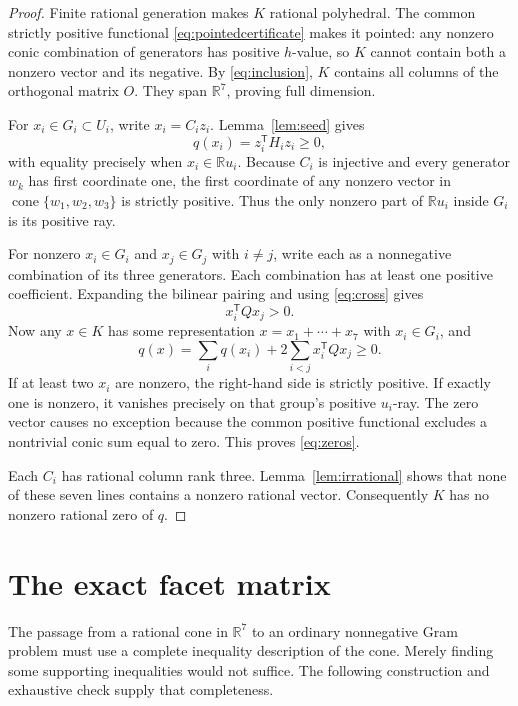 \documentclass[11pt]{article}
\theoremstyle{definition}
\newcommand{\R}{\mathbb R}
\newcommand{\cone}{\operatorname{cone}}
\newcommand{\trans}{^{\mathsf T}}
\numberwithin{equation}{section}
\begin{document}
\begin{proof}
Finite rational generation makes $K$ rational polyhedral. The common
strictly positive functional \eqref{eq:pointedcertificate} makes it pointed:
any nonzero conic combination of generators has positive $h$-value, so
$K$ cannot contain both a nonzero vector and its negative. By
\eqref{eq:inclusion}, $K$ contains all columns of the orthogonal matrix $O$.
They span $\R^7$, proving full dimension.

For $x_i\in G_i\subset U_i$, write $x_i=C_iz_i$. Lemma~\ref{lem:seed} gives
\[
 q(x_i)=z_i\trans H_iz_i\geq0,
\]
with equality precisely when $x_i\in\R u_i$. Because $C_i$ is injective
and every generator $w_k$ has first coordinate one, the first coordinate
of any nonzero vector in $\cone\{w_1,w_2,w_3\}$ is strictly positive.
Thus the only nonzero part of $\R u_i$ inside $G_i$ is its positive ray.

For nonzero $x_i\in G_i$ and $x_j\in G_j$ with $i\ne j$, write each as a
nonnegative combination of its three generators. Each combination has at
least one positive coefficient. Expanding the bilinear pairing and using
\eqref{eq:cross} gives
\begin{equation}\label{eq:crossGi}
 x_i\trans Qx_j>0.
\end{equation}
Now any $x\in K$ has some representation $x=x_1+\cdots+x_7$ with
$x_i\in G_i$, and
\begin{equation}\label{eq:qsum}
 q(x)=\sum_i q(x_i)+2\sum_{i<j}x_i\trans Qx_j\geq0.
\end{equation}
If at least two $x_i$ are nonzero, the right-hand side is strictly positive.
If exactly one is nonzero, it vanishes precisely on that group's positive
$u_i$-ray. The zero vector causes no exception because the common positive
functional excludes a nontrivial conic sum equal to zero. This proves
\eqref{eq:zeros}.

Each $C_i$ has rational column rank three. Lemma~\ref{lem:irrational}
shows that none of these seven lines contains a nonzero rational vector.
Consequently $K$ has no nonzero rational zero of $q$.
\end{proof}

\section{The exact facet matrix}\label{sec:facets}
The passage from a rational cone in $\R^7$ to an ordinary nonnegative Gram
problem must use a complete inequality description of the cone. Merely
finding some supporting inequalities would not suffice. The following
construction and exhaustive check supply that completeness.
\end{document}
